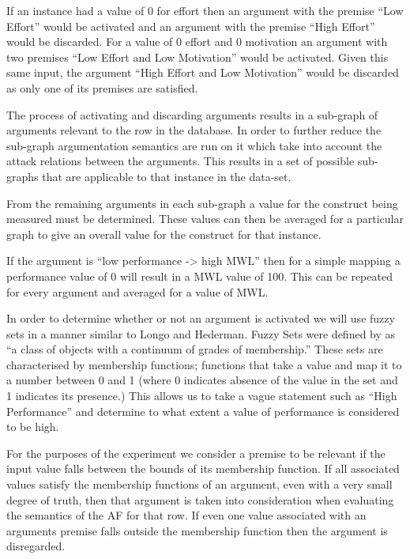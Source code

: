 \begin{exmp}
If an instance had a value of 0 for effort then an argument with the premise ``Low Effort'' would be activated and an argument with the premise ``High Effort'' would be discarded. For a value of 0 effort and 0 motivation an argument with two premises ``Low Effort and Low Motivation'' would be activated. Given this same input, the argument ``High Effort and Low Motivation'' would be discarded as only one of its premises are satisfied.
\end{exmp}

The process of activating and discarding arguments results in a sub-graph of arguments relevant to the row in the database. In order to further reduce the sub-graph argumentation semantics are run on it which take into account the attack relations between the arguments. This results in a set of possible sub-graphs that are applicable to that instance in the data-set.

From the remaining arguments in each sub-graph a value for the construct being measured must be determined. These values can then be averaged for a particular graph to give an overall value for the construct for that instance. 

\begin{exmp}
If the argument is ``low performance -> high MWL'' then for a simple mapping a performance value of 0 will result in a MWL value of 100. This can be repeated for every argument and averaged for a value of MWL.
\end{exmp}

In order to determine whether or not an argument is activated we will use fuzzy sets in a manner similar to Longo and Hederman. Fuzzy Sets were defined by \cite{zadeh1965fuzzy} as ``a class of objects with a continuum of grades of membership.'' These sets are characterised by membership functions; functions that take a value and map it to a number between 0 and 1 (where 0 indicates absence of the value in the set and 1 indicates its presence.) This allows us to take a vague statement such as ``High Performance'' and determine to what extent a value of performance is considered to be high. 

For the purposes of the experiment we consider a premise to be relevant if the input value falls between the bounds of its membership function. If all associated values satisfy the membership functions of an argument, even with a very small degree of truth, then that argument is taken into consideration when evaluating the semantics of the AF for that row. If even one value associated with an arguments premise falls outside the membership function then the argument is disregarded.

